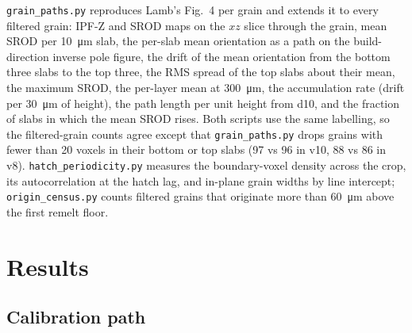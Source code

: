 \documentclass[11pt,a4paper]{article}
\newcommand{\code}[1]{\texttt{#1}}
\begin{document}
\code{grain\_paths.py} reproduces Lamb's Fig.~4 per grain and extends it to every filtered grain: IPF-Z and SROD maps on the $xz$ slice through the grain, mean SROD per \SI{10}{\micro\metre} slab, the per-slab mean orientation as a path on the build-direction inverse pole figure, the drift of the mean orientation from the bottom three slabs to the top three, the RMS spread of the top slabs about their mean, the maximum SROD, the per-layer mean at \SI{300}{\micro\metre}, the accumulation rate (drift per \SI{30}{\micro\metre} of height), the path length per unit height from d10, and the fraction of slabs in which the mean SROD rises. Both scripts use the same labelling, so the filtered-grain counts agree except that \code{grain\_paths.py} drops grains with fewer than 20 voxels in their bottom or top slabs (97 vs 96 in v10, 88 vs 86 in v8). \code{hatch\_periodicity.py} measures the boundary-voxel density across the crop, its autocorrelation at the hatch lag, and in-plane grain widths by line intercept; \code{origin\_census.py} counts filtered grains that originate more than \SI{60}{\micro\metre} above the first remelt floor.

\section{Results}
\subsection{Calibration path}
\begin{table}[htbp]
\centering\small
\caption{Full builds against Lamb 2024 Fig.~5a (all-originating SROD, central \SI{400}{\micro\metre} crop, one realisation each).}
\label{tab:path}
\end{table}
\end{document}
